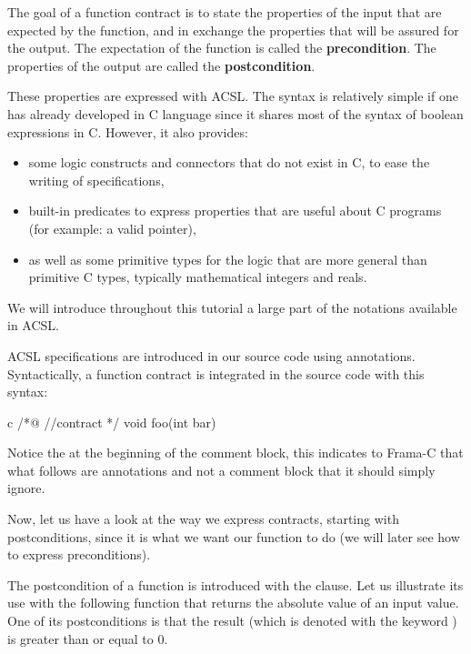 The goal of a function contract is to state the properties of the input that are
expected by the function, and in exchange the properties that will be assured
for the output. The expectation of the function is called the
\textbf{precondition}. The properties of the output are called the
\textbf{postcondition}.



These properties are expressed with ACSL. The syntax is relatively
simple if one has already developed in C language since it shares most
of the syntax of boolean expressions in C. However, it also provides:
\begin{itemize}
\item
  some logic constructs and connectors that do not exist in C, to ease
  the writing of specifications,
\item
  built-in predicates to express properties that are useful about C
  programs (for example: a valid pointer),
\item
  as well as some primitive types for the logic that are more general
  than primitive C types, typically mathematical integers and reals.
\end{itemize}



We will introduce throughout this tutorial a large part of the notations
available in ACSL.



ACSL specifications are introduced in our source code using annotations.
Syntactically, a function contract is integrated in the source code with
this syntax:



\begin{CodeBlock}{c}
/*@
  //contract
*/
void foo(int bar){

}
\end{CodeBlock}



Notice the  at the beginning of the comment block, this
indicates to Frama-C that what follows are annotations and not a comment
block that it should simply ignore.



Now, let us have a look at the way we express contracts, starting with
postconditions, since it is what we want our function to do (we will
later see how to express preconditions).





The postcondition of a function is introduced with the  clause.
Let us illustrate its use with the following function
that returns the absolute value of an input value. One of its postconditions
is that the result (which is denoted with the keyword
) is greater than or equal to 0.



